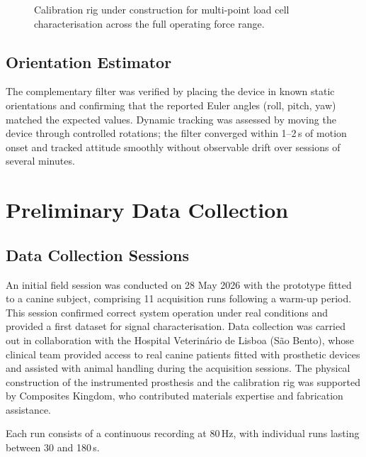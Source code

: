\begin{figure}[ht]
  \centering
  \fbox{\rule{0pt}{6cm}\rule{0.75\linewidth}{0pt}}
  \caption{Calibration rig under construction for multi-point load cell
           characterisation across the full operating force range.}
  \label{fig:calib_rig}
\end{figure}

\subsection{Orientation Estimator}

The complementary filter was verified by placing the device in known static
orientations and confirming that the reported Euler angles (roll, pitch, yaw)
matched the expected values.
Dynamic tracking was assessed by moving the device through controlled
rotations; the filter converged within 1--2\,s of motion onset and tracked
attitude smoothly without observable drift over sessions of several minutes.

\section{Preliminary Data Collection}
\label{section:preliminary_data}

\subsection{Data Collection Sessions}

An initial field session was conducted on 28 May 2026 with the prototype
fitted to a canine subject, comprising 11 acquisition runs following a
warm-up period.
This session confirmed correct system operation under real conditions and
provided a first dataset for signal characterisation.
Data collection was carried out in collaboration with the Hospital
Veterinário de Lisboa (São Bento), whose clinical team provided access to
real canine patients fitted with prosthetic devices and assisted with animal
handling during the acquisition sessions.
The physical construction of the instrumented prosthesis and the calibration
rig was supported by Composites Kingdom, who contributed materials expertise
and fabrication assistance.

Each run consists of a continuous recording at 80\,Hz, with individual
runs lasting between 30 and 180\,s.


